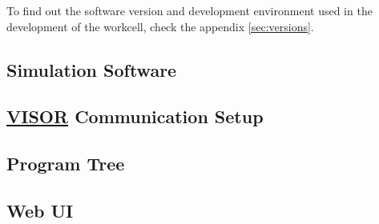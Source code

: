 To find out the software version and development environment used in the development of the workcell, check the appendix \ref{sec:versions}.


\subsection{Simulation Software}
\label{subsec:simulation-software}



\subsection{\hyperref[acro:VISOR]{VISOR}\textsuperscript{\textregistered} Communication Setup}
\label{subsec:computer-vision}


\subsection{Program Tree}
\label{subsec:program-tree}


\subsection{Web UI}
\label{subsec:web-ui}
